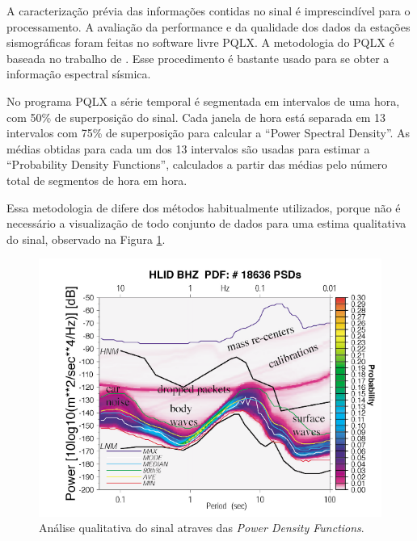 A caracterização prévia das informações contidas no sinal é imprescindível para o processamento. A avaliação da performance e da qualidade dos dados da estações sismográficas foram feitas no software livre PQLX.  A metodologia do PQLX é baseada no trabalho de \cite{McNamara_Buland_2004}. Esse procedimento é bastante usado para se obter a informação espectral sísmica.

No programa PQLX a série temporal é segmentada em intervalos de uma hora, com 50\% de superposição do sinal. Cada janela de hora está separada em 13 intervalos com 75\% de superposição para calcular a “Power Spectral Density”. As médias obtidas para cada um dos 13 intervalos são usadas para estimar a “Probability Density Functions”, calculados a partir das médias pelo número total de segmentos de hora em hora. 

Essa metodologia de \cite{McNamara_Buland_2004} difere dos métodos habitualmente utilizados, porque não é necessário a visualização de todo conjunto de dados para uma estima qualitativa do sinal, observado na Figura \ref{figura3}.

\begin{figure}[!ht]
\centering
\includegraphics[scale=0.8]{mcnamura_buland.png}
\caption{Análise qualitativa do sinal atraves das \textit{Power Density Functions}. \cite{McNamara_Buland_2004} }
\label{figura3}
\end{figure}

